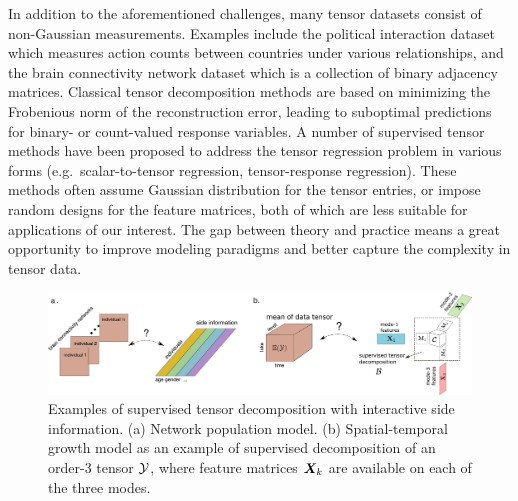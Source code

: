 \documentclass[10pt]{article}
\theoremstyle{definition}
\theoremstyle{definition}
\theoremstyle{definition}
\begin{document}
In addition to the aforementioned challenges, many tensor datasets consist of non-Gaussian measurements. Examples include the political interaction dataset \cite{hu2015scalable} which measures action counts between countries under various relationships, and the brain connectivity network dataset \cite{zhang2018mapping} which is a collection of binary adjacency matrices. Classical tensor decomposition methods are based on minimizing the Frobenious norm of the reconstruction error, leading to suboptimal predictions for binary- or count-valued response variables. A number of supervised tensor methods have been proposed \cite{narita2012tensor} to address the tensor regression problem in various forms (e.g.\ scalar-to-tensor regression, tensor-response regression). These methods often assume Gaussian distribution for the tensor entries, or impose random designs for the feature matrices, both of which are less suitable for applications of our interest. The gap between theory and practice means a great opportunity to improve modeling paradigms and better capture the complexity in tensor data. 

\begin{figure}[ht]
\begin{center}
\includegraphics[width=16cm]{demo.pdf}
\end{center}
\caption{Examples of supervised tensor decomposition with interactive side information. (a) Network population model. (b) Spatial-temporal growth model as an example of supervised decomposition of an order-3 tensor $\mathcal{Y}$, where feature matrices $\bm X_k$ are available on each of the three modes.}\label{fig:intro1}
\end{figure}
\end{document}

